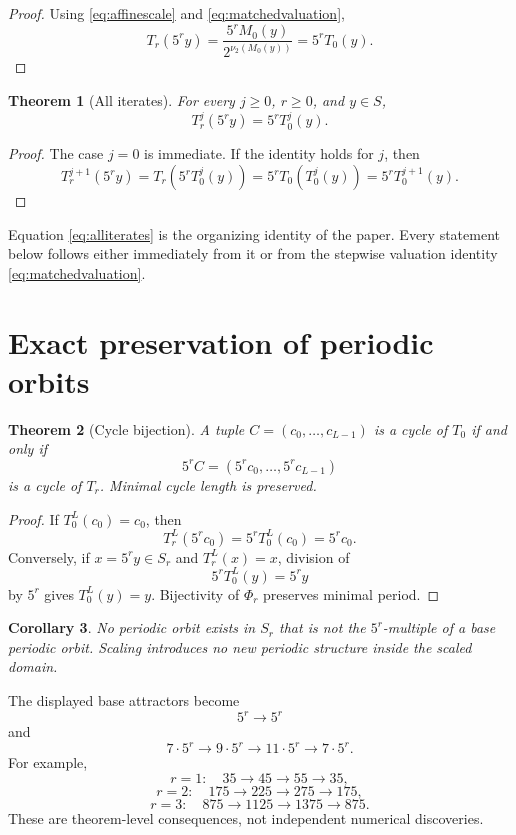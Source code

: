 \documentclass[11pt]{article}
\newtheorem{theorem}{Theorem}[section]
\newtheorem{corollary}[theorem]{Corollary}
\theoremstyle{remark}
\newcommand{\vTwo}{\nu_2}
\begin{document}
\begin{proof}
Using \eqref{eq:affinescale} and \eqref{eq:matchedvaluation},
\[
T_r(5^r y)
=\frac{5^rM_0(y)}{2^{\vTwo(M_0(y))}}
=5^rT_0(y).
\]
\end{proof}

\begin{theorem}[All iterates]
For every $j\ge0$, $r\ge0$, and $y\in S$,
\begin{equation}
T_r^j(5^r y)=5^rT_0^j(y).
\label{eq:alliterates}
\end{equation}
\end{theorem}

\begin{proof}
The case $j=0$ is immediate.  If the identity holds for $j$, then
\[
T_r^{j+1}(5^r y)
=T_r(5^rT_0^j(y))
=5^rT_0(T_0^j(y))
=5^rT_0^{j+1}(y).
\]
\end{proof}

Equation \eqref{eq:alliterates} is the organizing identity of the paper.  Every statement below follows either immediately from it or from the stepwise valuation identity \eqref{eq:matchedvaluation}.

\section{Exact preservation of periodic orbits}

\begin{theorem}[Cycle bijection]
A tuple $C=(c_0,\ldots,c_{L-1})$ is a cycle of $T_0$ if and only if
\[
5^rC=(5^rc_0,\ldots,5^rc_{L-1})
\]
is a cycle of $T_r$.  Minimal cycle length is preserved.
\end{theorem}

\begin{proof}
If $T_0^L(c_0)=c_0$, then
\[
T_r^L(5^rc_0)=5^rT_0^L(c_0)=5^rc_0.
\]
Conversely, if $x=5^ry\in S_r$ and $T_r^L(x)=x$, division of
\[
5^rT_0^L(y)=5^ry
\]
by $5^r$ gives $T_0^L(y)=y$.  Bijectivity of $\Phi_r$ preserves minimal period.
\end{proof}

\begin{corollary}
No periodic orbit exists in $S_r$ that is not the $5^r$-multiple of a base periodic orbit.  Scaling introduces no new periodic structure inside the scaled domain.
\end{corollary}

The displayed base attractors become
\begin{equation}
5^r\to5^r
\label{eq:fixedscaled}
\end{equation}
and
\begin{equation}
7\cdot5^r\to9\cdot5^r\to11\cdot5^r\to7\cdot5^r.
\label{eq:cyclescaled}
\end{equation}
For example,
\[
r=1:\quad35\to45\to55\to35,
\]
\[
r=2:\quad175\to225\to275\to175,
\]
\[
r=3:\quad875\to1125\to1375\to875.
\]
These are theorem-level consequences, not independent numerical discoveries.
\end{document}
